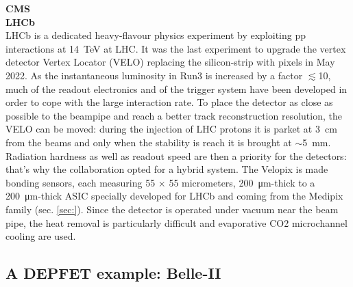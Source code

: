         \textbf{CMS}\\

        \vspace{5mm}
        \textbf{LHCb} \\
        LHCb is a dedicated heavy-flavour physics experiment by exploiting pp interactions at \SI{14}{TeV} at LHC. 
        It was the last experiment to upgrade the vertex detector Vertex Locator (VELO) replacing the silicon-strip with pixels in May 2022. 
        As the instantaneous luminosity in Run3 is increased by a factor $\lesssim$10, much of the readout electronics and of the trigger system have been developed in order to cope with the large interaction rate.
        To place the detector as close as possible to the beampipe and reach a better track reconstruction resolution, the VELO can be moved: during the injection of LHC protons it is parket at \SI{3}{cm} from the beams and only when the stability is reach it is brought at $\sim$\SI{5}{mm}. Radiation hardness as well as readout speed are then a priority for the detectors: that's why the collaboration opted for a hybrid system. 
        The Velopix is made bonding sensors, each measuring 55 $\times$ 55 micrometers, \SI{200}{\um}-thick to a \SI{200}{\um}-thick ASIC specially developed for LHCb and coming from the Medipix family (sec. \ref{sec:}).
        Since the detector is operated under vacuum near the beam pipe, the heat removal is particularly difficult and evaporative CO2 microchannel cooling are used. 

    \subsection{A DEPFET example: Belle-II}
        

